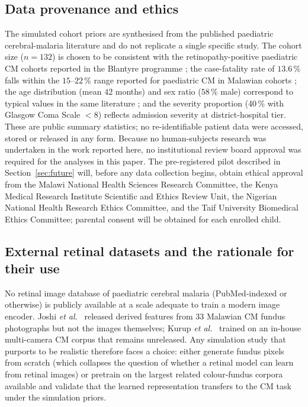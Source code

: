 \documentclass[twocolumn,10pt]{article}
\begin{document}
\subsection{Data provenance and ethics}
\label{sec:ethics}
The simulated cohort priors are synthesised from the published
paediatric cerebral-malaria literature and do not replicate a
single specific study. The cohort size ($n = 132$) is chosen to
be consistent with the retinopathy-positive paediatric CM
cohorts reported in the Blantyre programme
\cite{BeareArch2004,Beare2009,BeareEye2023}; the case-fatality
rate of $13.6\,\%$ falls within the $15$--$22\,\%$ range
reported for paediatric CM in Malawian cohorts
\cite{Taylor2004,Idro2010,Dondorp2010}; the age distribution
(mean $42$ months) and sex ratio ($58\,\%$ male) correspond to
typical values in the same literature
\cite{Beare2006,Beare2009}; and the severity proportion (40\,\%
with Glasgow Coma Scale $<8$) reflects admission severity at
district-hospital tier. These are public summary statistics;
no re-identifiable patient data were accessed, stored or
released in any form. Because no human-subjects research was
undertaken in the work reported here, no institutional review
board approval was required for the analyses in this paper.
The pre-registered pilot described in Section~\ref{sec:future}
will, before any data collection begins, obtain ethical approval
from the Malawi National Health Sciences Research Committee,
the Kenya Medical Research Institute Scientific and Ethics
Review Unit, the Nigerian National Health Research Ethics
Committee, and the Taif University Biomedical Ethics
Committee; parental consent will be obtained for each enrolled
child.

\subsection{External retinal datasets and the rationale for
their use}
\label{sec:external_datasets}
No retinal image database of paediatric cerebral malaria
(PubMed-indexed or otherwise) is publicly available at a scale
adequate to train a modern image encoder. Joshi
\emph{et al.}\ \cite{Joshi2017} released derived features from
33 Malawian CM fundus photographs but not the images themselves;
Kurup \emph{et al.}\ \cite{Kurup2023} trained on an in-house
multi-camera CM corpus that remains unreleased. Any simulation
study that purports to be realistic therefore faces a choice:
either generate fundus pixels from scratch (which collapses the
question of whether a retinal model can learn from retinal
images) or pretrain on the largest related
colour-fundus corpora available and validate that the learned
representation transfers to the CM task under the simulation
priors.
\end{document}
